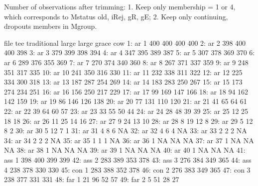 Number of observations after trimming: 1. Keep only membership = 1 or 4, which corresponds to Mstatus old, iRej, gR, gE; 2. Keep only continuing, dropouts members in Mgroup.
\begin{Schunk}
\begin{Soutput}
    file tee traditional large large grace cow
 1:   ar   1         400   400         400 400
 2:   ar   2         398   400         400 398
 3:   ar   3         379   399         398 394
 4:   ar   4         347   395         389 387
 5:   ar   5         307   378         369 370
 6:   ar   6         289   376         355 369
 7:   ar   7         270   374         340 360
 8:   ar   8         267   371         337 359
 9:   ar   9         248   351         317 335
10:   ar  10         241   350         316 330
11:   ar  11         232   338         311 322
12:   ar  12         225   334         300 318
13:   ar  13         187   287         254 269
14:   ar  14         183   283         250 267
15:   ar  15         173   274         234 251
16:   ar  16         156   250         217 229
17:   ar  17          99   169         147 166
18:   ar  18          94   162         142 159
19:   ar  19          86   146         126 138
20:   ar  20          77   131         110 120
21:   ar  21          41    65          64  61
22:   ar  22          39    64          60  57
23:   ar  23          33    55          50  44
24:   ar  24          28    48          39  39
25:   ar  25          12    25          18  18
26:   ar  26          11    25          14  16
27:   ar  27           9    24          13  10
28:   ar  28           8    19          12   8
29:   ar  29           5    12           8   2
30:   ar  30           5    12           7   1
31:   ar  31           4     8           6  NA
32:   ar  32           4     6           4  NA
33:   ar  33           2     2           2  NA
34:   ar  34           2     2           2  NA
35:   ar  35           1     1           1  NA
36:   ar  36           1    NA          NA  NA
37:   ar  37           1    NA          NA  NA
38:   ar  38           1    NA          NA  NA
39:   ar  39           1    NA          NA  NA
40:   ar  40           1    NA          NA  NA
41:  ass   1         398   400         399 399
42:  ass   2         283   389         353 378
43:  ass   3         276   384         349 365
44:  ass   4         238   378         330 330
45:  con   1         283   388         352 378
46:  con   2         276   383         349 365
47:  con   3         238   377         331 331
48:  far   1          21    96          52  57
49:  far   2           5    51          28  27

\end{Soutput}
\end{Schunk}
